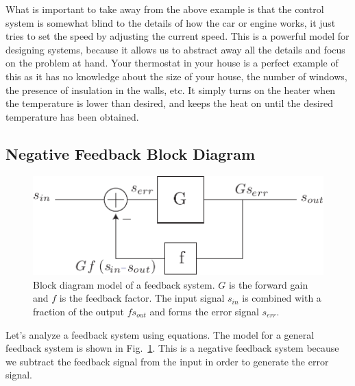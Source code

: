 What is important to take away from the above example is that the control system is somewhat blind to the details of how the car or engine works, it just tries to set the speed by adjusting the current speed.  This is a powerful model for designing systems, because it allows us to abstract away all the details and focus on the problem at hand.  Your thermostat in your house is a perfect example of this as it has no knowledge about the size of your house, the number of windows, the presence of insulation in the walls, etc.  It simply turns on the heater when the temperature is lower than desired, and keeps the heat on until the desired temperature has been obtained.  
\subsection{Negative Feedback Block Diagram}
\begin{figure}[tb]
\begin{center}
\includegraphics[scale=.7]{fbblock2}
\end{center}
\caption{Block diagram model of a feedback system.  $G$ is the forward gain and $f$ is the feedback factor.  The input signal $s_{in}$ is combined with a fraction of the output $f s_{out}$ and forms the error signal $s_{err}$.}
\label{fig:fbblock2}
\end{figure}

Let's analyze a feedback system using equations.  The model for a general feedback system is shown in Fig.~\ref{fig:fbblock2}.  This is a negative feedback system because we subtract the feedback signal from the input in order to generate the error signal.

